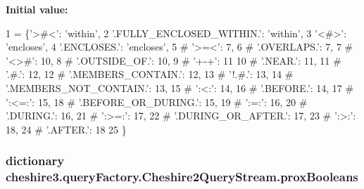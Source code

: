 {\bfseries Initial value\-:}
\begin{DoxyCode}
1 = \{\textcolor{stringliteral}{'>#<'}: \textcolor{stringliteral}{'within'},
2                     \textcolor{stringliteral}{'.FULLY\_ENCLOSED\_WITHIN.'}: \textcolor{stringliteral}{'within'},
3                     \textcolor{stringliteral}{'<#>'}: \textcolor{stringliteral}{'encloses'},
4                     \textcolor{stringliteral}{'.ENCLOSES.'}: \textcolor{stringliteral}{'encloses'},
5 \textcolor{comment}{#                    '>=<': 7,}
6 \textcolor{comment}{#                    '.OVERLAPS.': 7,}
7 \textcolor{comment}{#                    '<>#': 10,}
8 \textcolor{comment}{#                    '.OUTSIDE\_OF.': 10,}
9 \textcolor{comment}{#                    '+-+': 11}
10 \textcolor{comment}{#                    '.NEAR.': 11,}
11 \textcolor{comment}{#                    '.#.': 12,}
12 \textcolor{comment}{#                    '.MEMBERS\_CONTAIN.': 12,}
13 \textcolor{comment}{#                    '!.#.': 13,}
14 \textcolor{comment}{#                    '.MEMBERS\_NOT\_CONTAIN.': 13,}
15 \textcolor{comment}{#                    ':<:': 14,}
16 \textcolor{comment}{#                    '.BEFORE.': 14,}
17 \textcolor{comment}{#                    ':<=:': 15,}
18 \textcolor{comment}{#                    '.BEFORE\_OR\_DURING.': 15,}
19 \textcolor{comment}{#                    ':=:': 16,}
20 \textcolor{comment}{#                    '.DURING.': 16,}
21 \textcolor{comment}{#                    ':>=:': 17,}
22 \textcolor{comment}{#                    '.DURING\_OR\_AFTER.': 17,}
23 \textcolor{comment}{#                    ':>:': 18,}
24 \textcolor{comment}{#                    '.AFTER.': 18}
25                     \}
\end{DoxyCode}
\hypertarget{classcheshire3_1_1query_factory_1_1_cheshire2_query_stream_a01cad70bf5c5fc7d28a6ccaf2de30dd1}{
\subsubsection[{prox\-Booleans}]{\setlength{\rightskip}{0pt plus 5cm}dictionary cheshire3.\-query\-Factory.\-Cheshire2\-Query\-Stream.\-prox\-Booleans\hspace{0.3cm}{\ttfamily [static]}}}\label{classcheshire3_1_1query_factory_1_1_cheshire2_query_stream_a01cad70bf5c5fc7d28a6ccaf2de30dd1}
